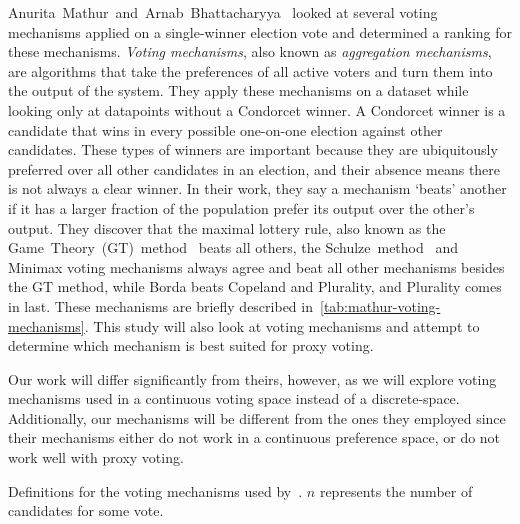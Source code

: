 Anurita~Mathur~and~Arnab~Bhattacharyya~\cite{Mathur2017} looked at several voting
mechanisms applied on a single-winner election vote and determined a ranking for
these mechanisms.
\textit{Voting mechanisms}, also known as \textit{aggregation mechanisms}, are
algorithms that take the preferences of all active voters and turn them into the
output of the system.
They apply these mechanisms on a dataset while looking only at datapoints without a
Condorcet winner.
A Condorcet winner is a candidate that wins in every possible one-on-one election
against other candidates.
These types of winners are important because they are ubiquitously preferred over
all other candidates in an election, and their absence means there is not always a
clear winner.
In their work, they say a mechanism `beats' another if it has a larger fraction of
the population prefer its output over the other's output.
They discover that the maximal lottery rule, also known as the
Game~Theory~(GT)~method~\cite{Rivest2010} beats all others, the
Schulze~method~\cite{Schulze2011} and Minimax voting mechanisms always agree and beat
all other mechanisms besides the GT method, while Borda beats Copeland and Plurality,
and Plurality comes in last.
These mechanisms are briefly described in~\autoref{tab:mathur-voting-mechanisms}.
This study will also look at voting mechanisms and attempt to determine which
mechanism is best suited for proxy voting.

Our work will differ significantly from theirs, however, as we will explore voting
mechanisms used in a continuous voting space instead of a discrete-space.
Additionally, our mechanisms will be different from the ones they employed since
their mechanisms either do not work in a continuous preference space, or do not work
well with proxy voting.

\begin{table}[htbp]
    \renewcommand{\arraystretch}{1.3}

    \caption{
        Definitions for the voting mechanisms used by~\cite{Mathur2017}.
        $n$ represents the number of candidates for some vote.
    }
    \label{tab:mathur-voting-mechanisms}

    \centering
    
\end{table}
%

